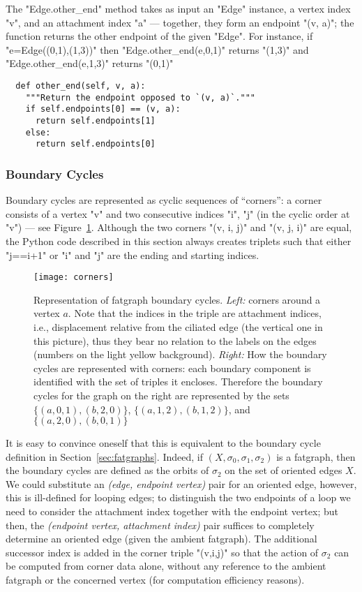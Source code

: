 The "Edge.other_end" method takes as input an "Edge" instance, a
vertex index "v", and an attachment index "a" --- together, they
form an endpoint "(v, a)"; the function returns the other endpoint
of the given "Edge".  For instance, if "e=Edge((0,1),(1,3))"
then "Edge.other_end(e,0,1)" returns "(1,3)" and
"Edge.other_end(e,1,3)" returns "(0,1)"
\begin{lstlisting}
  def other_end(self, v, a):
    """Return the endpoint opposed to `(v, a)`."""
    if self.endpoints[0] == (v, a):
      return self.endpoints[1]
    else:
      return self.endpoints[0]

\end{lstlisting}




\subsubsection{Boundary Cycles}
\label{sec:boundary-cycles}

Boundary cycles are represented as cyclic sequences of ``corners'': a
corner consists of a vertex "v" and two consecutive indices "i", "j"
(in the cyclic order at "v") --- see Figure~\ref{fig:corners}. 
Although the two corners "(v, i, j)" and "(v, j, i)" are equal, the
Python code described in this section always creates triplets such that
either "j==i+1" or "i" and "j" are the ending and starting indices.
\begin{figure}
  \centering
  \texttt{[image: corners]}
  \caption{Representation of fatgraph boundary cycles. \emph{Left:}
    corners around a vertex $a$. Note that the indices in the triple
    are attachment indices, i.e., displacement relative from the
    ciliated edge (the vertical one in this picture), thus they bear
    no relation to the labels on the edges (numbers on the light
    yellow background). \emph{Right:} How the boundary cycles are
    represented with corners: each boundary component is identified
    with the set of triples it encloses. Therefore the boundary cycles
    for the graph on the right are represented by the sets $\{(a,0,1),
    (b,2,0)\}$, $\{(a,1,2), (b,1,2)\}$, and $\{(a,2,0), (b,0,1)\}$}
  \label{fig:corners}
\end{figure}
It is easy to convince oneself that this is equivalent to the boundary
cycle definition in Section~\ref{sec:fatgraphs}.  Indeed, if $(X, \sigma_0,
\sigma_1, \sigma_2)$ is a fatgraph, then the boundary cycles are
defined as the orbits of $\sigma_2$ on the set of oriented edges
$X$. We could substitute an \emph{(edge, endpoint vertex)} pair for an
oriented edge, however, this is ill-defined for looping edges; to
distinguish the two endpoints of a loop we need to consider the
attachment index together with the endpoint vertex; but then, the
\emph{(endpoint vertex, attachment index)} pair suffices to completely
determine an oriented edge (given the ambient fatgraph).  The
additional successor index is added in the corner triple "(v,i,j)"
so that the action of $\sigma_2$ can be computed from corner data
alone, without any reference to the ambient fatgraph or the concerned
vertex (for computation efficiency reasons).

